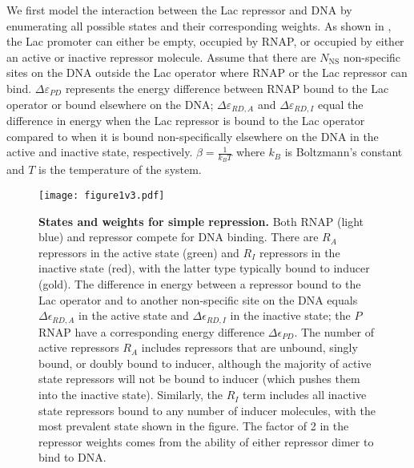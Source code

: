 We first model the interaction between the Lac repressor and DNA by enumerating
all possible states and their corresponding weights. As shown in
\fref[figpolymeraseRepressorStates], the Lac promoter can either be empty,
occupied by RNAP, or occupied by either an active or inactive repressor
molecule. Assume that there are $N_{\text{NS}}$ non-specific sites on the DNA outside
the Lac operator where RNAP or the Lac repressor can bind. \(\Delta\varepsilon_{PD}\)
represents the energy difference between RNAP bound to the Lac operator  or bound
elsewhere on the DNA; \(\Delta\varepsilon_{RD,A}\) and \(\Delta\varepsilon_{RD,I}\) equal the
difference in energy when the Lac repressor is bound to the Lac operator
compared to when it is bound non-specifically elsewhere on the DNA in the active
and inactive state, respectively. $\beta = \frac{1}{k_BT}$ where $k_B$ is
Boltzmann's constant and $T$ is the temperature of the system.

\begin{figure}[h]
	\centering \texttt{[image: figure1v3.pdf]}
	\caption{{\bf States and weights for simple repression.}  Both RNAP (light blue)
		and repressor compete for DNA binding. There are $R_A$ repressors in the active
		state (green) and $R_I$ repressors in the inactive state (red), with the latter
		type typically bound to inducer (gold). The difference in energy between a
		repressor bound to the Lac operator and to another non-specific site on the DNA
		equals $\Delta\epsilon_{RD,A}$ in the active state and $\Delta\epsilon_{RD,I}$
		in the inactive state; the $P$ RNAP have a corresponding energy difference
		$\Delta\epsilon_{PD}$. The number of active repressors $R_A$ includes
		repressors that are unbound, singly bound, or doubly bound to inducer, although
		the majority of active state repressors will not be bound to inducer (which
		pushes them into the inactive state). Similarly, the $R_I$ term includes all
		inactive state repressors bound to any number of inducer molecules, with the
		most prevalent state shown in the figure. The factor of 2 in the repressor
		weights comes from the ability of either repressor dimer to bind to DNA. }
	\label{figpolymeraseRepressorStates}
\end{figure}



